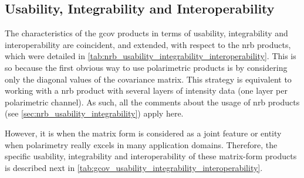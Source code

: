 \subsection{Usability, Integrability and Interoperability}
\label{sec:usability_pol}

The characteristics of the \acs{gcov} products in terms of usability, integrability and interoperability are coincident, and extended, with respect to the \acs{nrb} products, which were detailed in \autoref{tab:nrb_usability_integrability_interoperability}. This is so because the first obvious way to use polarimetric products is by considering only the diagonal values of the covariance matrix. This strategy is equivalent to working with a \acs{nrb} product with several layers of intensity data (one layer per polarimetric channel). As such, all the comments about the usage of \acs{nrb} products (see \autoref{sec:nrb_usability_integrability}) apply here. 

However, it is when the matrix form is considered as a joint feature or entity when polarimetry really excels in many application domains. Therefore, the specific usability, integrability and interoperability of these matrix-form products is described next in \autoref{tab:gcov_usability_integrability_interoperability}. 

